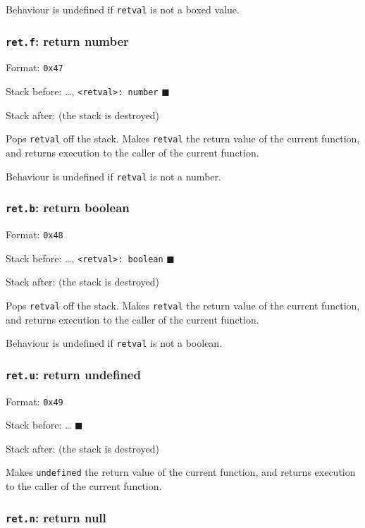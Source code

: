 Behaviour is undefined if \texttt{retval} is not a boxed value.

\subsubsection{\texorpdfstring{\texttt{ret.f}: return
number}{ret.f: return number}}

Format: \texttt{0x47}

Stack before: \ldots, \texttt{\textless{}retval\textgreater{}:\ number}
\(\blacksquare\)

Stack after: (the stack is destroyed)

Pops \texttt{retval} off the stack. Makes \texttt{retval} the return
value of the current function, and returns execution to the caller of
the current function.

Behaviour is undefined if \texttt{retval} is not a number.

\subsubsection{\texorpdfstring{\texttt{ret.b}: return
boolean}{ret.b: return boolean}}

Format: \texttt{0x48}

Stack before: \ldots, \texttt{\textless{}retval\textgreater{}:\ boolean}
\(\blacksquare\)

Stack after: (the stack is destroyed)

Pops \texttt{retval} off the stack. Makes \texttt{retval} the return
value of the current function, and returns execution to the caller of
the current function.

Behaviour is undefined if \texttt{retval} is not a boolean.

\subsubsection{\texorpdfstring{\texttt{ret.u}: return
undefined}{ret.u: return undefined}}

Format: \texttt{0x49}

Stack before: \ldots{} \(\blacksquare\)

Stack after: (the stack is destroyed)

Makes \texttt{undefined} the return value of the current function, and
returns execution to the caller of the current function.

\subsubsection{\texorpdfstring{\texttt{ret.n}: return
null}{ret.n: return null}}

